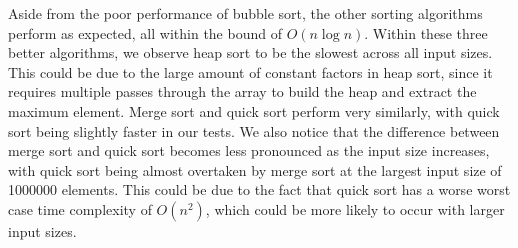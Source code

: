 \documentclass{article}
\begin{document}
Aside from the poor performance of bubble sort, the other sorting algorithms perform as expected, all within the bound of $O(n \log n)$.
Within these three better algorithms, we observe heap sort to be the slowest across all input sizes.
This could be due to the large amount of constant factors in heap sort, since it requires multiple passes through the array to build the heap and extract the maximum element.
Merge sort and quick sort perform very similarly, with quick sort being slightly faster in our tests. 
We also notice that the difference between merge sort and quick sort becomes less pronounced as the input size increases, with quick sort being almost overtaken by merge sort at the largest input size of 1000000 elements.
This could be due to the fact that quick sort has a worse worst case time complexity of $O(n^2)$, which could be more likely to occur with larger input sizes.
\end{document}
